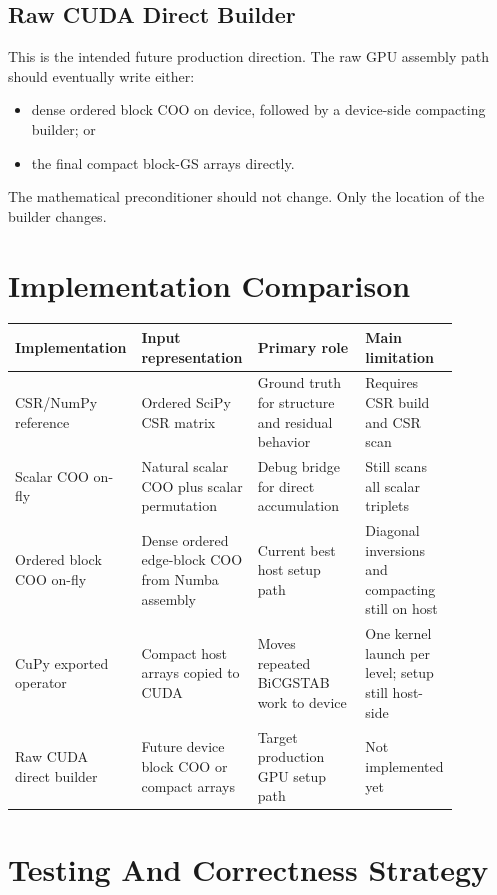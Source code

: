\documentclass[11pt]{article}
\begin{document}
\subsection{Raw CUDA Direct Builder}

This is the intended future production direction.  The raw GPU assembly path
should eventually write either:
\begin{itemize}[nosep]
  \item dense ordered block COO on device, followed by a device-side compacting
        builder; or
  \item the final compact block-GS arrays directly.
\end{itemize}
The mathematical preconditioner should not change.  Only the location of the
builder changes.

\section{Implementation Comparison}

\begin{center}
\begin{tabular}{p{0.20\linewidth}p{0.24\linewidth}p{0.24\linewidth}p{0.20\linewidth}}
\toprule
Implementation & Input representation & Primary role & Main limitation \\
\midrule
CSR/NumPy reference & Ordered SciPy CSR matrix & Ground truth for structure and residual behavior & Requires CSR build and CSR scan \\
Scalar COO on-fly & Natural scalar COO plus scalar permutation & Debug bridge for direct accumulation & Still scans all scalar triplets \\
Ordered block COO on-fly & Dense ordered edge-block COO from Numba assembly & Current best host setup path & Diagonal inversions and compacting still on host \\
CuPy exported operator & Compact host arrays copied to CUDA & Moves repeated BiCGSTAB work to device & One kernel launch per level; setup still host-side \\
Raw CUDA direct builder & Future device block COO or compact arrays & Target production GPU setup path & Not implemented yet \\
\bottomrule
\end{tabular}
\end{center}

\section{Testing And Correctness Strategy}
\label{sec:testing}
\end{document}
